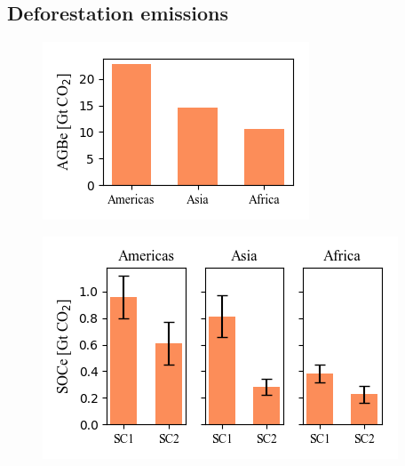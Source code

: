 \clearpage

	\subsection{Deforestation emissions}
	\label{subsec:emissions}

		\begin{figure}[ht]
			\centering
			\includegraphics[scale=1]{img/agbe}
			\caption[Ecosystem service values]{}
			\label{fig:agbe}
		\end{figure}
		\begin{figure}[ht]
			\centering
			\includegraphics[scale=1]{img/soce}
			\caption[Ecosystem service values]{}
			\label{fig:soce}
		\end{figure}
		
